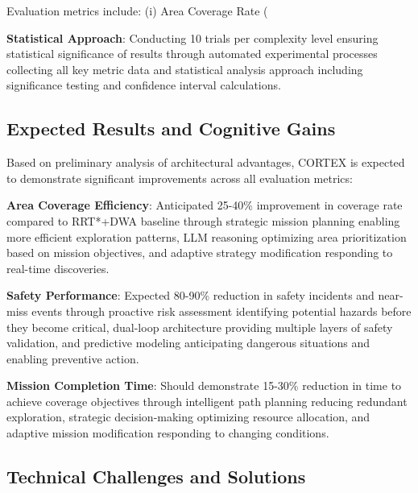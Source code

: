 Evaluation metrics include: (i) Area Coverage Rate (%

\textbf{Statistical Approach}: Conducting 10 trials per complexity level ensuring statistical significance of results through automated experimental processes collecting all key metric data and statistical analysis approach including significance testing and confidence interval calculations.

\subsection{Expected Results and Cognitive Gains}

Based on preliminary analysis of architectural advantages, CORTEX is expected to demonstrate significant improvements across all evaluation metrics:

\textbf{Area Coverage Efficiency}: Anticipated 25-40\% improvement in coverage rate compared to RRT*+DWA baseline through strategic mission planning enabling more efficient exploration patterns, LLM reasoning optimizing area prioritization based on mission objectives, and adaptive strategy modification responding to real-time discoveries.

\textbf{Safety Performance}: Expected 80-90\% reduction in safety incidents and near-miss events through proactive risk assessment identifying potential hazards before they become critical, dual-loop architecture providing multiple layers of safety validation, and predictive modeling anticipating dangerous situations and enabling preventive action.

\textbf{Mission Completion Time}: Should demonstrate 15-30\% reduction in time to achieve coverage objectives through intelligent path planning reducing redundant exploration, strategic decision-making optimizing resource allocation, and adaptive mission modification responding to changing conditions.

\subsection{Technical Challenges and Solutions}


